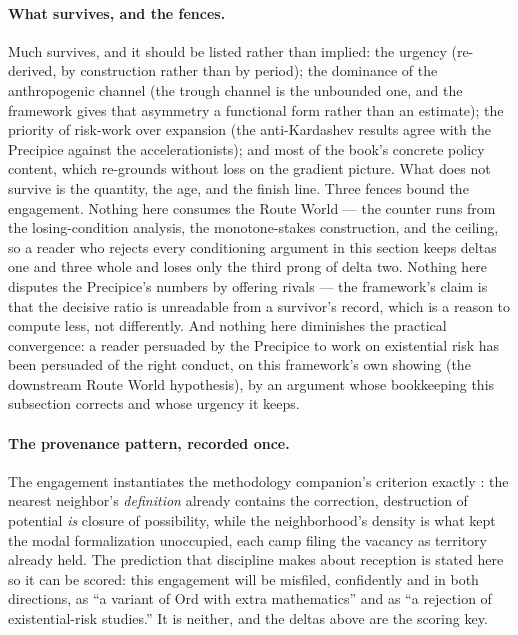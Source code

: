 \documentclass[11pt]{article}
\theoremstyle{plain}
\theoremstyle{definition}
\theoremstyle{remark}
\begin{document}
\paragraph{What survives, and the fences.} Much survives, and it
should be listed rather than implied: the urgency (re-derived, by
construction rather than by period); the dominance of the
anthropogenic channel (the trough channel is the unbounded one, and
the framework gives that asymmetry a functional form rather than an
estimate); the priority of risk-work over expansion (the
anti-Kardashev results agree with the Precipice against the
accelerationists); and most of the book's concrete policy content,
which re-grounds without loss on the gradient picture. What does not
survive is the quantity, the age, and the finish line. Three fences
bound the engagement. Nothing here consumes the Route World --- the
counter runs from the losing-condition analysis, the monotone-stakes
construction, and the ceiling, so a reader who rejects every
conditioning argument in this section keeps deltas one and three
whole and loses only the third prong of delta two. Nothing here
disputes the Precipice's numbers by offering rivals --- the
framework's claim is that the decisive ratio is unreadable from a
survivor's record, which is a reason to compute less, not
differently. And nothing here diminishes the practical convergence:
a reader persuaded by the Precipice to work on existential risk has
been persuaded of the right conduct, on this framework's own showing
(the downstream Route World hypothesis), by an argument whose bookkeeping this
subsection corrects and whose urgency it keeps.

\paragraph{The provenance pattern, recorded once.} The engagement
instantiates the methodology companion's criterion exactly
\cite{Ben26Method}: the nearest neighbor's \emph{definition} already
contains the correction, destruction of potential \emph{is}
closure of possibility, while the neighborhood's density is what
kept the modal formalization unoccupied, each camp filing the vacancy
as territory already held. The prediction that discipline makes about
reception is stated here so it can be scored: this engagement will be
misfiled, confidently and in both directions, as ``a variant of Ord
with extra mathematics'' and as ``a rejection of existential-risk
studies.'' It is neither, and the deltas above are the scoring key.
\end{document}
